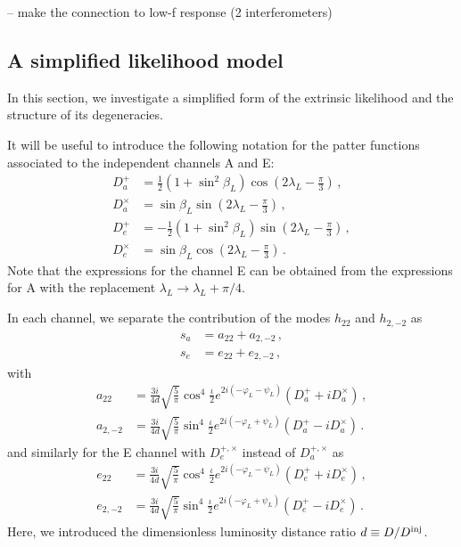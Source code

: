 \documentclass[aps,showpacs,twocolumn,prd,superscriptaddress,nofootinbib]{revtex4}
\newcommand{\bsub}{\begin{subequations}}
\newcommand{\esub}{\end{subequations}}
\newcommand\betaL{{\beta_{L}}}
\newcommand\lambdaL{{\lambda_{L}}}
\newcommand\varphiL{{\varphi_{L}}}
\newcommand\psiL{{\psi_{L}}}
\begin{document}
-- make the connection to low-f response (2 interferometers)


\subsection{A simplified likelihood model}
\label{sec:simple-like}

In this section, we investigate a simplified form of the extrinsic likelihood and the structure of its degeneracies.

It will be useful to introduce the following notation for the patter functions associated to the independent channels A and E:
\bsub\label{eq:defDaDe}
\begin{align}
	D_{a}^{+} &= \frac{1}{2} \left( 1 + \sin^{2}\betaL \right) \cos\left( 2\lambdaL - \frac{\pi}{3} \right) \,, \\
	D_{a}^{\times} &= \sin \betaL \sin\left( 2\lambdaL - \frac{\pi}{3} \right) \,, \\
	D_{e}^{+} &= - \frac{1}{2} \left( 1 + \sin^{2}\betaL \right) \sin\left( 2\lambdaL - \frac{\pi}{3} \right) \,, \\
	D_{e}^{\times} &= \sin \betaL \cos\left( 2\lambdaL - \frac{\pi}{3} \right) \,.
\end{align}
\esub
Note that the expressions for the channel E can be obtained from the expressions for A with the replacement $\lambdaL \rightarrow \lambdaL + \pi/4$.

In each channel, we separate the contribution of the modes $h_{22}$ and $h_{2,-2}$ as
\bsub\label{eq:defsase}
\begin{align}
	s_{a} &= a_{22} + a_{2,-2} \,, \\
	s_{e} &= e_{22} + e_{2,-2} \,,
\end{align}
\esub
with
\bsub\label{eq:defa22a2m2}
\begin{align}
	a_{22} &= \frac{3i}{4d} \sqrt{\frac{5}{\pi}} \cos^{4}\frac{\iota}{2} e^{2i(-\varphiL-\psiL)} \left( D_{a}^{+} + i D_{a}^{\times} \right) \,, \\
	a_{2,-2} &= \frac{3i}{4d} \sqrt{\frac{5}{\pi}} \sin^{4}\frac{\iota}{2} e^{2i(-\varphiL+\psiL)} \left( D_{a}^{+} - i D_{a}^{\times} \right) \,.
\end{align}
\esub
and similarly for the E channel with $D_{e}^{+,\times}$ instead of $D_{a}^{+, \times}$ as
\bsub\label{eq:defe22e2m2}
\begin{align}
	e_{22} &= \frac{3i}{4d} \sqrt{\frac{5}{\pi}} \cos^{4}\frac{\iota}{2} e^{2i(-\varphiL-\psiL)} \left( D_{e}^{+} + i D_{e}^{\times} \right) \,, \\
	e_{2,-2} &= \frac{3i}{4d} \sqrt{\frac{5}{\pi}} \sin^{4}\frac{\iota}{2} e^{2i(-\varphiL+\psiL)} \left( D_{e}^{+} - i D_{e}^{\times} \right) \,.
\end{align}
\esub
Here, we introduced the dimensionless luminosity distance ratio $d \equiv D / D^{\rm inj}$.
\end{document}
